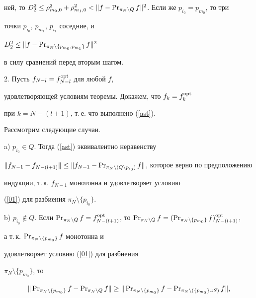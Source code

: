 \begin{pf}
ней, то $D_2^2\leq \rho_{m_0,0}^2+\rho_{m_1,0}^2<


\|f-\PR_{\pi_N\setminus Q}f\|^2$. Если же $p_{i_0}=p_{m_0}$, то три


точки $p_{i_0}$, $p_{m_1}$, $p_{i_1}$ соседние, и


$D_2^2\leq\|f-\operatorname{Pr}_{\pi_N\setminus\{p_{m_0},p_{m_1}\}}f\|^2$


в силу сравнений перед вторым шагом.





2. Пусть $f_{N-l}=f_{N-l}^{\operatorname{opt}}$ для любой $f$,


удовлетворяющей условиям теоремы. Докажем, что $f_k=f_k^{\operatorname{opt}}$


при $k=N-(l+1)$, т.\,е. что выполнено (\ref{ast}).


Рассмотрим следующие случаи.





a) $p_{i_0}\in Q$. Тогда (\ref{ast}) эквивалентно неравенству


$\|f_{N-1}-f_{N-(l+1)}\|\leq\|f_{N-1}-\PR_{\pi_N\setminus


(Q\setminus p_{i_0})}f\|$, которое верно по предположению


индукции, т.\,к. $f_{N-1}$ монотонна и удовлетворяет условию


(\ref{01}) для разбиения $\pi_N \setminus \{p_{i_0}\}$.





b) $p_{i_0}\notin Q$. Если $\PR_{\pi_N\setminus


Q}f=f_{N-(l+1)}^{\opt}$, то $\PR_{\pi_N\setminus


Q}f=(\PR_{\pi_N\setminus\{p_{m_0}\}}f)_{N-(l+1)}^{\opt}$,


а т.\,к. $\operatorname{Pr}_{\pi_N\setminus\{p_{m_0}\}}f$ монотонна и


удовлетворяет условию (\ref{01}) для разбиения


$\pi_N\setminus\{p_{m_0}\}$, то


\begin{equation}


\|\PR_{\pi_N\setminus\{p_{m_0}\}}f-\PR_{\pi_N\setminus Q}f\|\geq


\|\PR_{\pi_N\setminus\{p_{m_0}\}}f-\PR_{\pi_N\setminus


(\{p_{m_0}\}\cup S)}f\|, \label{Y}


\end{equation}



\end{pf}
